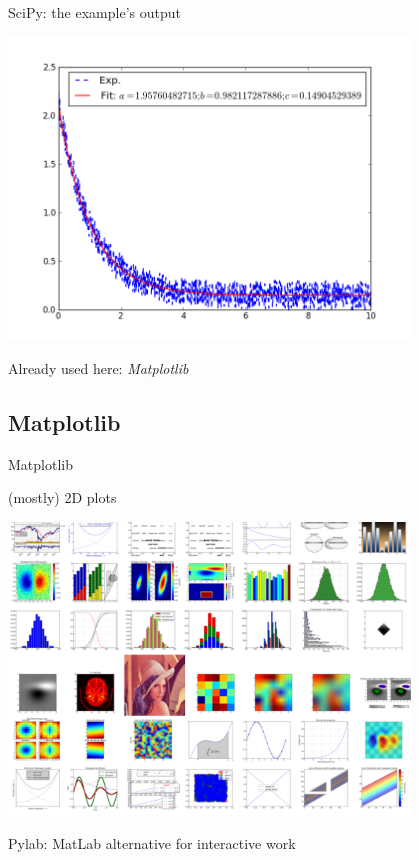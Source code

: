 \begin{frame}{SciPy: the example's output}

\begin{center}
    \includegraphics[width=0.8\textwidth]{Figures/fit-png}
\end{center}

Already used here: \emph{Matplotlib}

\end{frame}

\subsection{Matplotlib}

\begin{frame}{Matplotlib}

(mostly) 2D plots

\begin{center}
\includegraphics[width=0.8\textwidth]{Figures/mpl}
\end{center}

Pylab: MatLab alternative for interactive work
\end{frame}



